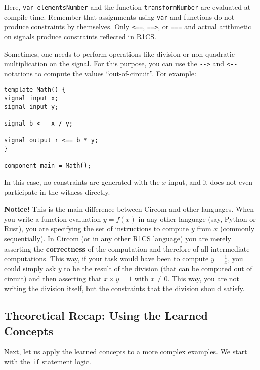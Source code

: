 \documentclass[../lecture-notes-148x210.tex]{subfiles}
\begin{document}
Here, \texttt{var elementsNumber} and the function \texttt{transformNumber}
are evaluated at compile time. Remember that assignments using \texttt{var} and
functions do not produce constraints by themselves. Only \texttt{<==},
\texttt{==>}, or \texttt{===} and actual arithmetic on signals produce
constraints reflected in R1CS.

\begin{remark}
    Sometimes, one needs to perform operations like division or non-quadratic multiplication on the signal.
    For this purpose, you can use the \texttt{{-}->} and \texttt{<-{-}} notations to compute the values ``out-of-circuit''. For example:

    \begin{lstlisting}[language=Circom,numbers=none]
template Math() {
signal input x;
signal input y;

signal b <-- x / y;

signal output r <== b * y;
}

component main = Math();
    \end{lstlisting}\label{code:division-example}

    In this case, no constraints are generated with the $x$ input, and it does not even participate in the witness directly.

    \textcolor{green!50!black}{\textbf{Notice!}} This is the main difference between Circom and other languages. When you
    write a function evaluation $y = f(x)$ in any other language (say, Python or Rust),
    you are specifying the set of instructions to compute $y$ from $x$ (commonly
    sequentially). In Circom (or in any other R1CS language) you are merely asserting
    the \textbf{correctness} of the computation and therefore of all
    intermediate computations. This way, if your task would have been to compute
    $y = \frac{1}{x}$, you could simply ask $y$ to be the result of the division
    (that can be computed out of circuit) and then asserting that $x \times y = 1$
    with $x \neq 0$. This way, you are not writing the division itself, but
    the constraints that the division should satisfy.
\end{remark}

\subsection{Theoretical Recap: Using the Learned Concepts}

Next, let us apply the learned concepts to a more complex examples. We start
with the \texttt{if} statement logic.
\end{document}
